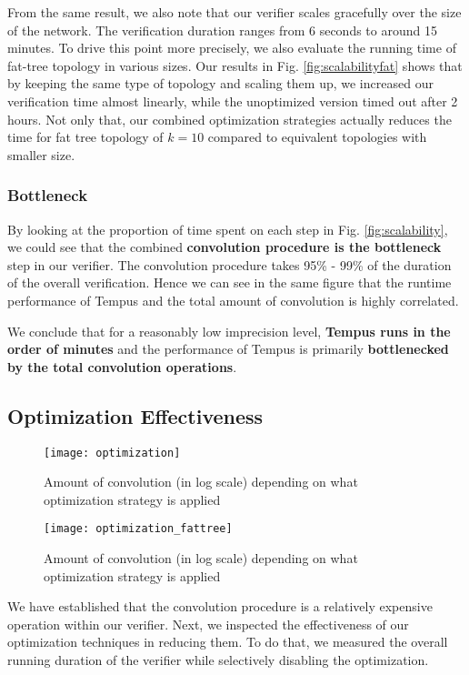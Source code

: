 From the same result, we also note that our verifier scales gracefully over the size of the network.
The verification duration ranges from 6 seconds to around 15 minutes. 
To drive this point more precisely, we also evaluate the running time of fat-tree topology in various sizes.
Our results in Fig. \ref{fig:scalabilityfat} shows that by keeping the same type of topology and scaling them up, we increased 
our verification time almost linearly, while the unoptimized version timed out after 2 hours.
Not only that, our combined optimization strategies actually reduces the time for fat tree topology of $k=10$ compared to 
equivalent topologies with smaller size.

\subsubsection{Bottleneck}
By looking at the proportion of time spent on each step in Fig. \ref{fig:scalability}, we could see that 
the combined \textbf{convolution procedure is the bottleneck} step in our verifier.
The convolution procedure takes 95\% - 99\% of the duration of the overall verification.
Hence we can see in the same figure that the runtime performance of Tempus and the total amount 
of convolution is highly correlated.

We conclude that for a reasonably low imprecision level, \textbf{Tempus runs in the order of 
minutes} and the performance of Tempus is primarily \textbf{bottlenecked by the total convolution 
operations}.

\subsection{Optimization Effectiveness}

\begin{figure}[h]
    \centering
    \texttt{[image: optimization]}
    \caption{Amount of convolution (in log scale) depending on what optimization strategy is applied}
    \label{fig:opt}
\end{figure}
\begin{figure}[h]
    \centering
    \texttt{[image: optimization\_fattree]}
    \caption{Amount of convolution (in log scale) depending on what optimization strategy is applied}
    \label{fig:opt_fat}
\end{figure}

We have established that the convolution procedure is a relatively expensive operation within 
our verifier.
Next, we inspected the effectiveness of our optimization techniques in reducing them.
To do that, we measured the overall running duration of the verifier while selectively disabling the 
optimization.

